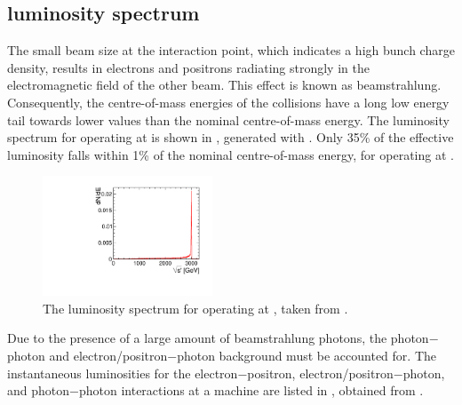 



\subsection{\CLIC luminosity spectrum}
\label{sec:pandoraCLUClumi}

The small \CLIC beam size  at the interaction point, which indicates a high bunch charge density, results in electrons and positrons radiating strongly in the electromagnetic field of the other beam. This effect is known as beamstrahlung. Consequently, the centre-of-mass energies of the \ee collisions  have a long low energy tail towards lower values than the nominal centre-of-mass energy. The luminosity spectrum for \CLIC operating at  is shown in , generated with \Guineapig \cite{Schulte:1999tx}. Only 35\% of the effective luminosity falls within 1\% of the nominal centre-of-mass energy, for \CLIC operating at .

\begin{figure}[tbph]
\centering
    \includegraphics[width=0.45\textwidth]{pandora/Lumi3TeV_fixed_nopeak.pdf}
\caption
{The luminosity spectrum for \CLIC operating at , taken from \cite{Linssen:2012hp}.}
\label{fig:pandoraCLICLumiSpec}
\end{figure}

Due to the presence of a large amount of beamstrahlung photons, the photon$-$photon and electron/positron$-$photon  background must be accounted for. The instantaneous luminosities for the electron$-$positron,  electron/positron$-$photon, and photon$-$photon interactions  at a  \CLIC machine are listed in , obtained from \Guineapig.


